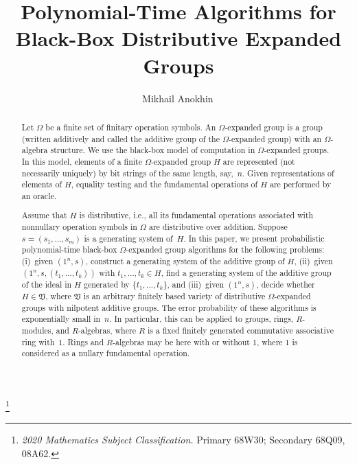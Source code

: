 \documentclass{jgcc}
\newcommand{\cl}{\mathfrak}
\begin{document}
\title[Polynomial-Time Algorithms]{Polynomial-Time
Algorithms for Black-Box Distributive Expanded Groups}

\author[M.~Anokhin]{Mikhail
Anokhin\,}

\address{Information Security Center, Faculty of
Computational Mathematics and Cybernetics, Lomonosov Moscow
State University, Moscow, Russia}


\thanks{\textit{2020 Mathematics Subject Classification.}
Primary 68W30; Secondary 68Q09, 08A62.}

\begin{abstract}
Let $\Omega$ be a finite set of finitary operation symbols.
An $\Omega$-expanded group is a group (written additively
and called the additive group of the $\Omega$-expanded
group) with an $\Omega$-algebra structure. We use the
black-box model of computation in $\Omega$-expanded groups.
In this model, elements of a finite $\Omega$-expanded group
$H$ are represented (not necessarily uniquely) by bit
strings of the same length, say,~$n$. Given representations
of elements of $H$, equality testing and the fundamental
operations of $H$ are performed by an oracle.

Assume that $H$ is distributive, i.e., all its fundamental
operations associated with nonnullary operation symbols in
$\Omega$ are distributive over addition. Suppose
$s=(s_1,\dots,s_m)$ is a generating system of~$H$. In this
paper, we present probabilistic polynomial-time black-box
$\Omega$-expanded group algorithms for the following
problems: (i)~given $(1^n,s)$, construct a generating system
of the additive group of $H$, (ii)~given
$(1^n,s,(t_1,\dots,t_k))$ with $t_1,\dots,t_k\in H$, find a
generating system of the additive group of the ideal in $H$
generated by $\{t_1,\dots,t_k\}$, and (iii)~given $(1^n,s)$,
decide whether $H\in\cl V$, where $\cl V$ is an arbitrary
finitely based variety of distributive $\Omega$-expanded
groups with nilpotent additive groups. The error probability
of these algorithms is exponentially small in~$n$. In
particular, this can be applied to groups, rings,
$R$-modules, and $R$-algebras, where $R$ is a fixed finitely
generated commutative associative ring with~$1$. Rings and
$R$-algebras may be here with or without $1$, where $1$ is
considered as a nullary fundamental operation.
\end{abstract}

\maketitle
\end{document}
